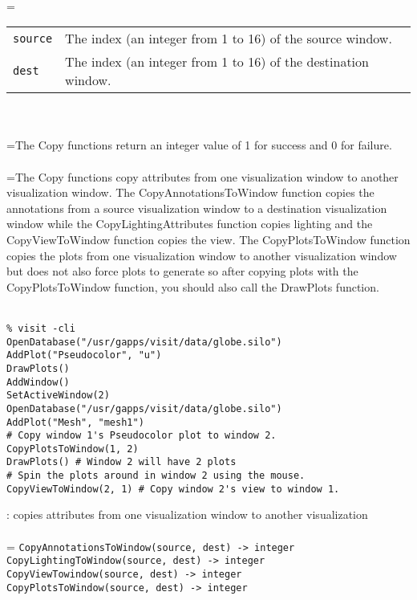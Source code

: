 \documentclass[10pt,a4paper]{report}
\begin{document}
 \\ 
\hangindent=\parindent 
\begin{tabular}{lp{9cm}}
\verb!source! & The index (an integer from 1 to 16) of the source window. \\
\verb!dest! & The index (an integer from 1 to 16) of the destination window. \\
\end{tabular} \\[-2mm]


 \\ 
\hangindent=\parindent The Copy functions return an integer value of 1 for success and 0 for failure. \\[-3mm] 

 \\ 
\hangindent=\parindent The Copy functions copy attributes from one visualization window to another visualization window. The CopyAnnotationsToWindow function copies the annotations from a source visualization window to a destination visualization window while the CopyLightingAttributes function copies lighting and the CopyViewToWindow function copies the view. The CopyPlotsToWindow function copies the plots from one visualization window to another visualization window but does not also force plots to generate so after copying plots with the CopyPlotsToWindow function, you should also call the DrawPlots function. \\[-3mm] 

\\[-6mm]
\begin{verbatim}% visit -cli
OpenDatabase("/usr/gapps/visit/data/globe.silo")
AddPlot("Pseudocolor", "u")
DrawPlots()
AddWindow()
SetActiveWindow(2)
OpenDatabase("/usr/gapps/visit/data/globe.silo")
AddPlot("Mesh", "mesh1")
# Copy window 1's Pseudocolor plot to window 2.
CopyPlotsToWindow(1, 2) 
DrawPlots() # Window 2 will have 2 plots
# Spin the plots around in window 2 using the mouse.
CopyViewToWindow(2, 1) # Copy window 2's view to window 1.
\end{verbatim}
\newpage


{}
: copies attributes from one visualization window to another visualization\\[-3mm]

 \\ 
\hangindent=\parindent 
\verb!CopyAnnotationsToWindow(source, dest) -> integer!\\ 
\verb!CopyLightingToWindow(source, dest) -> integer!\\ 
\verb!CopyViewTowindow(source, dest) -> integer!\\ 
\verb!CopyPlotsToWindow(source, dest) -> integer!\\ [-3mm]
\end{document}
